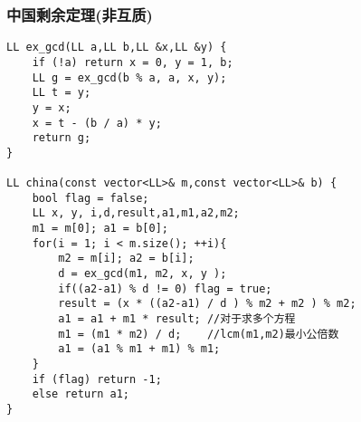 \subsubsection{中国剩余定理(非互质)}
\begin{verbatim}
LL ex_gcd(LL a,LL b,LL &x,LL &y) {
    if (!a) return x = 0, y = 1, b;
    LL g = ex_gcd(b % a, a, x, y);
    LL t = y;
    y = x;
    x = t - (b / a) * y;
    return g;
}

LL china(const vector<LL>& m,const vector<LL>& b) {
    bool flag = false;
    LL x, y, i,d,result,a1,m1,a2,m2;
    m1 = m[0]; a1 = b[0];
	for(i = 1; i < m.size(); ++i){
        m2 = m[i]; a2 = b[i];
        d = ex_gcd(m1, m2, x, y );
        if((a2-a1) % d != 0) flag = true;
        result = (x * ((a2-a1) / d ) % m2 + m2 ) % m2;
        a1 = a1 + m1 * result; //对于求多个方程
        m1 = (m1 * m2) / d;    //lcm(m1,m2)最小公倍数
        a1 = (a1 % m1 + m1) % m1;
    }
    if (flag) return -1;
    else return a1;
}
\end{verbatim}
